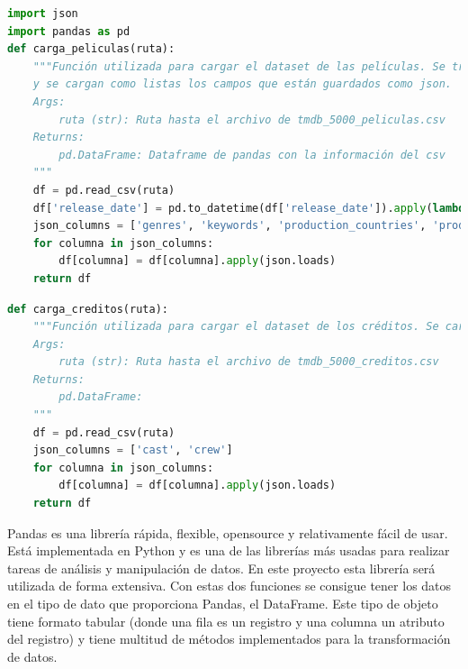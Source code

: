 \begin{lstlisting}[language=Python, caption={Lectura de los datos del fichero de películas. Se carga el fichero desde la ruta y se mapea la fecha de lanzamiento a un objeto de tipo fecha. Algunas de las columnas de entrada están en formato JSON, por lo que se cargan como JSON en vez de como texto plano para poder trabajar con ellas.}]
import json
import pandas as pd
def carga_peliculas(ruta):
    """Función utilizada para cargar el dataset de las películas. Se transforma a fecha el campo de fecha de salida
    y se cargan como listas los campos que están guardados como json.
    Args:
        ruta (str): Ruta hasta el archivo de tmdb_5000_peliculas.csv
    Returns:
        pd.DataFrame: Dataframe de pandas con la información del csv
    """
    df = pd.read_csv(ruta)
    df['release_date'] = pd.to_datetime(df['release_date']).apply(lambda x: x.date())
    json_columns = ['genres', 'keywords', 'production_countries', 'production_companies', 'spoken_languages']
    for columna in json_columns:
        df[columna] = df[columna].apply(json.loads)
    return df
\end{lstlisting}

\begin{lstlisting}[language=Python, caption={Lectura de los datos del fichero de créditos. Se carga el fichero desde la ruta dada. Para las columnas que están en formato tipo JSON, es interesante cargarlas como un JSON para tener un diccionario de Python en vez de un campo con el JSON como texto plano.}]
def carga_creditos(ruta):
    """Función utilizada para cargar el dataset de los créditos. Se cargan como listas los campos que están guardado
    Args:
        ruta (str): Ruta hasta el archivo de tmdb_5000_creditos.csv
    Returns:
        pd.DataFrame:
    """
    df = pd.read_csv(ruta)
    json_columns = ['cast', 'crew']
    for columna in json_columns:
        df[columna] = df[columna].apply(json.loads)
    return df
\end{lstlisting}

Pandas es una librería rápida, flexible, opensource y relativamente fácil de usar. Está implementada en Python y es una de las librerías más usadas para realizar tareas de análisis y manipulación de datos. En este proyecto esta librería será utilizada de forma extensiva. Con estas dos funciones se consigue tener los datos en el tipo de dato que proporciona Pandas, el DataFrame. Este tipo de objeto tiene formato tabular (donde una fila es un registro y una columna un atributo del registro) y tiene multitud de métodos implementados para la transformación de datos.\\

